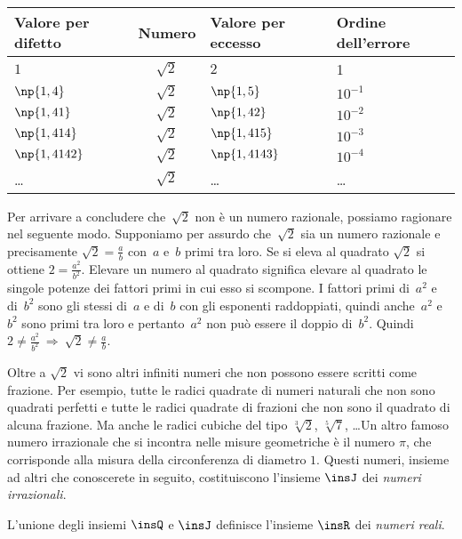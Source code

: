 \begin{center}
 \begin{tabular}{lcll}
\toprule
Valore per difetto & Numero &Valore per eccesso & Ordine dell'errore\\
\midrule
$1$           & $\sqrt{2}$ & $2$           & 1\\
$\np{1,4}$    & $\sqrt{2}$ & $\np{1,5}$    & $10^{-1}$\\
$\np{1,41}$   & $\sqrt{2}$ & $\np{1,42}$   & $10^{-2}$\\
$\np{1,414}$  & $\sqrt{2}$ & $\np{1,415}$  & $10^{-3}$\\
$\np{1,4142}$ & $\sqrt{2}$ & $\np{1,4143}$ & $10^{-4}$\\
\ldots        & $\sqrt{2}$ & \ldots        & \ldots\\
\bottomrule
\end{tabular}
\end{center}

Per arrivare a concludere che~$\sqrt{2}$ non è un numero razionale,
possiamo ragionare nel seguente modo. Supponiamo per assurdo che~$\sqrt{2}$
sia un numero razionale e precisamente $\sqrt{2}=\frac{a}{b}$ con~$a$ e~$b$ primi tra loro. Se si eleva al quadrato $\sqrt{2}$ si ottiene $2=\frac{a^{2}}{b^{2}}$.
Elevare un numero al quadrato significa elevare al quadrato le
singole potenze dei fattori primi in cui esso si scompone. I fattori
primi di~$a^{2}$ e di~$b^{2}$ sono gli stessi di~$a$ e di~$b$ con
gli esponenti raddoppiati, quindi anche~$a^{2}$ e~$b^{2}$
sono primi tra loro e pertanto~$a^{2}$ non può essere il doppio di~$b^{2}$.
Quindi~$2\ne\frac{a^{2}}{b^{2}} \:\Rightarrow\: \sqrt{2}\ne\frac{a}{b}$.

Oltre a $\sqrt{2}$ vi sono altri infiniti numeri che non possono essere scritti come frazione. Per esempio, tutte le radici quadrate di numeri naturali che non sono quadrati perfetti e tutte le radici quadrate di frazioni che non sono il quadrato di alcuna frazione. Ma anche le radici cubiche del tipo $\sqrt[{3}]{2}$, $\sqrt[{5}]{7}$, \dots Un altro famoso numero irrazionale che si incontra nelle misure geometriche è il numero $\pi$, che corrisponde alla
misura della circonferenza di diametro $1$.
Questi numeri, insieme ad altri che conoscerete in seguito, costituiscono l'insieme $\insJ$ dei \emph{numeri irrazionali}.

L'unione degli insiemi $\insQ$ e $\insJ$ definisce l'insieme $\insR$ dei \emph{numeri reali}.

\vspazio\ovalbox{\risolvi \ref{ese:1.1}}

